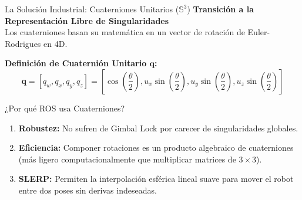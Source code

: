 \documentclass[aspectratio=169]{beamer}
\begin{document}
\begin{frame}{La Solución Industrial: Cuaterniones Unitarios ($\mathbb{S}^3$)}
    \textbf{Transición a la Representación Libre de Singularidades}\\
    Los cuaterniones basan su matemática en un vector de rotación de Euler-Rodrigues en 4D.
    
    \vspace{0.3cm}
    \textbf{Definición de Cuaternión Unitario $\mathbf{q}$:}
    \begin{equation*}
        \mathbf{q} = [q_w, q_x, q_y, q_z] = \left[ \cos\left(\frac{\theta}{2}\right), u_x \sin\left(\frac{\theta}{2}\right), u_y \sin\left(\frac{\theta}{2}\right), u_z \sin\left(\frac{\theta}{2}\right) \right]
    \end{equation*}
    
    \vspace{0.3cm}
    \begin{exampleblock}{¿Por qué ROS usa Cuaterniones?}
        \begin{enumerate}
            \item \textbf{Robustez:} No sufren de Gimbal Lock por carecer de singularidades globales.
            \item \textbf{Eficiencia:} Componer rotaciones es un producto algebraico de cuaterniones (más ligero computacionalmente que multiplicar matrices de $3\times3$).
            \item \textbf{SLERP:} Permiten la interpolación esférica lineal suave para mover el robot entre dos poses sin derivas indeseadas.
        \end{enumerate}
    \end{exampleblock}
\end{frame}
\end{document}
